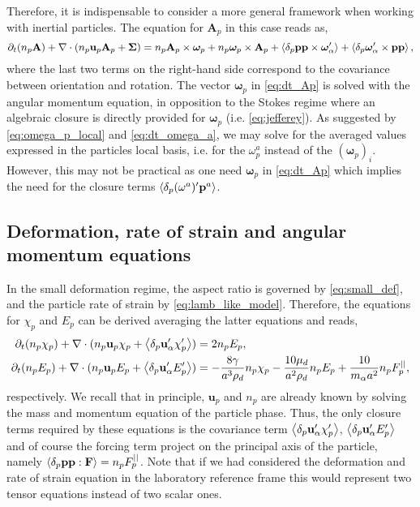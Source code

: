 Therefore, it is indispensable to consider a more general framework when working with inertial particles. 
The equation for $\textbf{A}_p$ in this case reads as, 
\begin{equation}
    \pddt (n_p\textbf{A})
    + \div (
        n_p\textbf{u}_p\textbf{A}_p
        + \mathbf{\Sigma}
        )
    =
    n_p \textbf{A}_p \times \bm\omega_p
    + n_p \bm\omega_p \times \textbf{A}_p
    + \pavg{\textbf{pp} \times \bm\omega_\alpha'}
    + \pavg{\bm\omega_\alpha' \times \textbf{pp}},
    \label{eq:dt_Ap}
\end{equation}
where the last two terms on the right-hand side correspond to the covariance between orientation and rotation. 
The vector $\bm\omega_p$ in \ref{eq:dt_Ap} is solved with the angular momentum equation, in opposition to the Stokes regime where an algebraic closure is directly provided for $\bm\omega_p$ (i.e. \ref{eq:jefferey}). 
As suggested by \ref{eq:omega_p_local} and \ref{eq:dt_omega_a}, we may solve for the averaged values expressed in the particles local basis, i.e. for the $\omega^a_p$ instead of the $(\bm\omega_p)_i$.
However, this may not be practical as one need $\bm\omega_p$ in \ref{eq:dt_Ap} which implies the need for the closure terms $\left<\delta_p (\omega^a)' \textbf{p}^a\right>$.


\subsection{Deformation, rate of strain and angular momentum equations}

In the small deformation regime, the aspect ratio is governed by \ref{eq:small_def}, and the particle rate of strain by  \ref{eq:lamb_like_model}. 
Therefore, the equations for $\chi_p$ and $E_p$ can be derived averaging the latter equations and reads,  
\begin{align}
    \pddt (n_p \chi_p)
    + \div (
        n_p \textbf{u}_p \chi_p 
        + \pavg{\textbf{u}_\alpha' \chi_p'}
    )
    &= 2 n_p E_p,
    \label{eq:avg_chi_I}
    \\
    \pddt (n_p E_p)
    + \div (
        n_p \textbf{u}_p E_p 
        + \pavg{\textbf{u}_\alpha' E_p'}
    )
    &= 
    - \frac{8 \gamma }{a^3\rho_d} n_p \chi_p
    - \frac{10 \mu_d}{a^2\rho_d} n_p E_p
    + \frac{10}{m_\alpha a^2} n_p F^{||}_p,
    \label{eq:avg_E_I}
\end{align}
respectively.
We recall that in principle, $\textbf{u}_p$ and $n_p$ are already known by solving the mass and momentum equation of the particle phase.
Thus, the only closure terms required by these equations is the covariance term $\left<\delta_p \textbf{u}_\alpha' \chi_p'\right>$, $ \left<\delta_p \textbf{u}_\alpha' E_p'\right>$ and of course the forcing term project on the principal axis of the particle, namely $\left<\delta_p \textbf{pp} : \textbf{F}\right> = n_p F_p^{||}$. 
Note that if we had considered the deformation and rate of strain equation in the laboratory reference frame this would represent two tensor equations instead of two scalar ones. 


